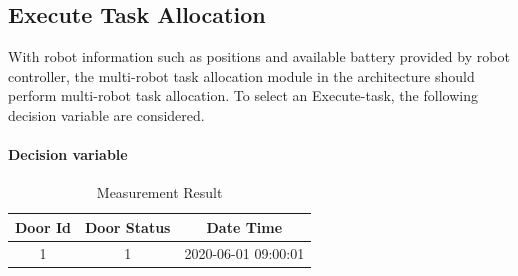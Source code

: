 \subsection{Execute Task Allocation}
\label{sec:task_allocation}
With robot information such as positions and available battery provided by robot controller, the multi-robot task allocation module in the architecture should perform multi-robot task allocation. To select an Execute-task, the following decision variable are considered.
\paragraph*{Decision variable}


\begin{table}[htb]
\centering
\begin{tabular}{|c| c| c|} 
\hline
Door Id & Door Status & Date Time \\
\hline
1& 1 & 2020-06-01 09:00:01 \\ [1ex] 
\hline
\end{tabular}
\caption{Measurement Result}
\label{tab:measurement_result}
\end{table}

\begin{table}[htb]
\centering
{}
\caption{Door Open Possibility}
\label{tab:open_possibilities}
\end{table}

